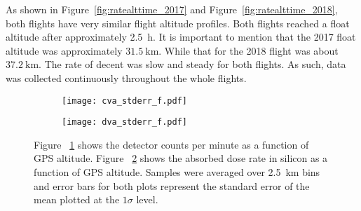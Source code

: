 %
As shown in Figure~\ref{fig:ratealttime_2017} and Figure~\ref{fig:ratealttime_2018}, both flights have very similar flight altitude profiles.  Both flights reached a float altitude after approximately \SI{2.5}{\hour}.  It is important to mention that the 2017 float altitude was approximately $\SI{31.5}{\kilo\meter}$.  While that for the 2018 flight was about $\SI{37.2}{\kilo\meter}$.  The rate of decent was slow and steady for both flights.  
%
As such, data was collected continuously throughout the whole flights. %
%

\begin{figure}[H]%
\centering
\begin{subfigure}{.5\textwidth}
  \centering
  \texttt{[image: cva\_stderr\_f.pdf]}
  \caption{}
  \label{fig:sub2}
\end{subfigure}%
\begin{subfigure}{.5\textwidth}
  \centering
  \texttt{[image: dva\_stderr\_f.pdf]}
  \caption{}
  \label{fig:sub1}
\end{subfigure}%
\caption{Figure ~\ref{fig:sub2} shows the detector counts per minute as a function of GPS altitude. Figure ~\ref{fig:sub1} shows the absorbed dose rate in silicon as a function of GPS altitude.  Samples were averaged over \SI{2.5}{\kilo\meter} bins and error bars for both plots represent the standard error of the mean plotted at the $1\sigma$ level.}
\label{fig:dose-count-subplots}
\end{figure}

